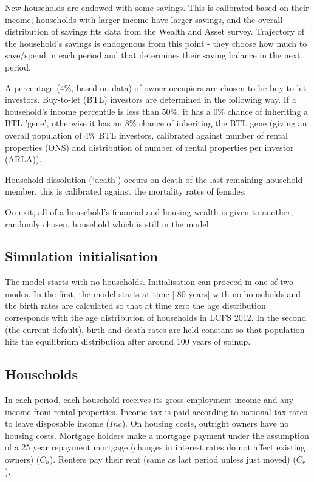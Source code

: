 \documentclass{article}
\begin{document}
New households are endowed with some savings. This is calibrated based on
their income; households with larger income have larger savings, and the
overall distribution of savings fits data from the Wealth and Asset survey.
Trajectory of the household's savings is endogenous from this point - they
choose how much to save/spend in each period and that determines their
saving balance in the next period.

A percentage (4\%, based on data) of owner-occupiers are chosen to be
buy-to-let investors. Buy-to-let (BTL) investors are determined in the
following way. If a household's income percentile is less than 50\%, it has
a 0\% chance of inheriting a BTL 'gene', otherwise it has an 8\% chance of
inheriting the BTL gene (giving an overall population of 4\% BTL investors,
calibrated against number of rental properties (ONS) and distribution of
number of rental properties per investor (ARLA)).

Household dissolution (`death') occurs on death of
the last remaining household member, this is calibrated against the mortality rates of
females.

On exit, all of a household's financial and housing wealth is given to
another, randomly chosen, household which is still in the model.

\subsection{Simulation initialisation}

The model starts  with no households. Initialisation can proceed in one of two modes. In the first, the model starts at time [-80 years] with no households and the birth rates are calculated so that at time zero the age distribution corresponds with the age distribution of households in LCFS 2012. In the second (the current default), birth and death rates are held constant so that population hits the equilibrium distribution after around 100 years of spinup.

\subsection{Households}

In each period, each household receives its gross employment income and any
income from rental properties. Income tax is paid according to national tax
rates to leave disposable income ($Inc$). On housing costs, outright owners
have no housing costs. Mortgage holders make a mortgage payment under the
assumption of a 25 year repayment mortgage (changes in interest rates do not affect
existing owners) ($C_{h}$). Renters pay their rent (same as last period
unless just moved) ($C_{r}$).
\end{document}

